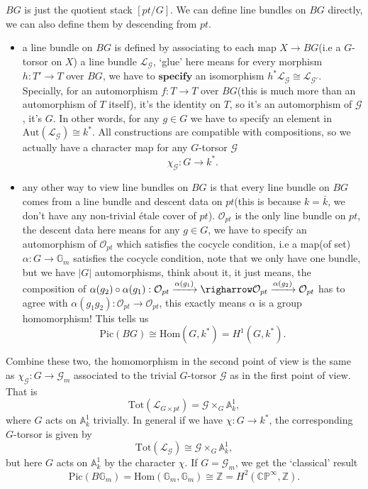 \documentclass[main.tex]{subfiles}
\begin{document}
\begin{example}
$BG$ is just the quotient stack $[pt/G]$. We can define line bundles on $BG$ directly, we can also define them by descending from $pt$. 
\begin{itemize}
\item a line bundle on $BG$ is defined by associating to each map $X\rightarrow BG$(i.e a $G$-torsor on $X$) a line bundle $\mathcal{L}_{\mathcal{G}}$, `glue' here means for every morphism $h:T'\rightarrow T$ over $BG$, we have to $\mathbf{specify}$ an isomorphism $h^{*}\mathcal{L}_{\mathcal{G}}\cong \mathcal{L}_{\mathcal{G}'}$. Specially, for an automorphism $f:T\rightarrow T$ over $BG$(this is much more than an automorphism of $T$ itself), it's the identity on $T$, so it's an automorphism of ${\mathcal{G}}$, it's $G$. In other words, for any $g\in G$ we have to specify an element in $\mathrm{Aut}(\mathcal{L}_{\mathcal{G}})\cong k^{*}.$ All constructions are compatible with compositions, so we actually have a character map for any $G$-torsor $\mathcal{G}$
$$\chi_{\mathcal{G}}:G\rightarrow k^{*}.$$
\item any other way to view line bundles on $BG$ is that every line bundle on $BG$ comes from a line bundle and descent data on $pt$(this is because $k=\bar{k}$, we don't have any non-trivial étale cover of $pt$). $\mathcal{O}_{pt}$ is the only line bundle on $pt$, the descent data here means for any $g\in G$, we have to specify an automorphism of $\mathcal{O}_{pt}$ which satisfies the cocycle condition, i.e a map(of set) $\alpha: G\rightarrow \mathbb{G}_{m}$ satisfies the cocycle condition, note that we only have one bundle, but we have $|G|$ automorphisms, think about it, it just means, the composition of $\alpha(g_{2})\circ \alpha(g_{1}): \mathcal{O}_{pt}\xrightarrow{\alpha(g_{1})}\righarrow \mathcal{O}_{pt}\xrightarrow{\alpha(g_{2})} \mathcal{O}_{pt}$ has to agree with $\alpha(g_{1}g_{2}):\mathcal{O}_{pt}\rightarrow \mathcal{O}_{pt}$, this exactly means $\alpha$ is a group homomorphism! This tells us
$$\mathrm{Pic}(BG)\cong \mathrm{Hom}(G,k^{*})=H^{1}(G,k^{*}).$$
\end{itemize}
Combine these two, the homomorphism in the second point of view is the same as $\chi_{\mathcal{G}}:G\rightarrow \mathcal{G}_{m}$ associated to the trivial $G$-torsor $\mathcal{G}$ as in the first point of view. That is 
$$\mathrm{Tot}(\mathcal{L}_{G\times pt})=\mathcal{G}\times_{G}\mathbb{A}_{k}^{1},$$
where $G$ acts on $\mathbb{A}_{k}^{1}$ trivially. In general if we have $\chi: G\rightarrow k^{*}$, the corresponding $G$-torsor is given by
$$\mathrm{Tot}(\mathcal{L}_{\mathcal{G}})\cong \mathcal{G}\times_{G}\mathbb{A}_{k}^{1},$$
but here $G$ acts on $\mathbb{A}_{k}^{1}$ by the character $\chi$.
If $G=\mathcal{G}_{m}$, we get the `classical' result
$$\mathrm{Pic}(B\mathbb{G}_{m})=\mathrm{Hom}(\mathbb{G}_{m},\mathbb{G}_{m})\cong \mathbb{Z}=H^{2}(\mathbb{CP}^{\infty},\mathbb{Z}).$$
\end{example}
\end{document}
